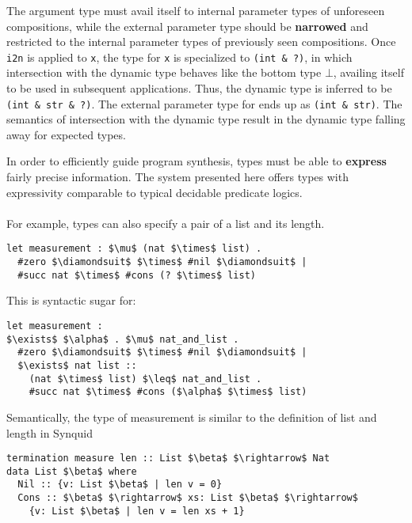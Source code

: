 \documentclass[sigplan,screen]{acmart}
\begin{document}
The argument type must avail itself to internal parameter types of unforeseen compositions,
while the external parameter type should be \textbf{narrowed} and restricted 
to the internal parameter types of previously seen compositions.
Once \lstinline{i2n} is applied to \lstinline{x}, 
the type for \lstinline{x} is specialized to \lstinline{(int & ?)}, 
in which intersection with the dynamic type behaves like the bottom type $\bot$,
availing itself to be used in subsequent applications. 
Thus, the dynamic type is inferred to be \lstinline{(int & str & ?)}.
The external parameter type for ends up as \lstinline{(int & str)}. 
The semantics of intersection with the dynamic type result in the dynamic type
falling away for expected types.



In order to efficiently guide program synthesis, 
types must be able to \textbf{express} fairly precise information. 
The system presented here offers types with 
expressivity comparable to typical decidable predicate logics. \\
\hfill \\
For example, types can also specify a pair of a list and its length.

\begin{lstlisting}[]
let measurement : $\mu$ (nat $\times$ list) .
  #zero $\diamondsuit$ $\times$ #nil $\diamondsuit$ | 
  #succ nat $\times$ #cons (? $\times$ list)
\end{lstlisting} 

\hfill

\noindent This is syntactic sugar for:

\begin{lstlisting}[]
let measurement : 
$\exists$ $\alpha$ . $\mu$ nat_and_list .
  #zero $\diamondsuit$ $\times$ #nil $\diamondsuit$ | 
  $\exists$ nat list :: 
    (nat $\times$ list) $\leq$ nat_and_list .
    #succ nat $\times$ #cons ($\alpha$ $\times$ list)
\end{lstlisting}

\hfill

\noindent Semantically, the type of measurement is similar to the definition of 
list and length in Synquid \cite{}    

\begin{lstlisting}[keywords={termination, measure, data, where}]
termination measure len :: List $\beta$ $\rightarrow$ Nat 
data List $\beta$ where
  Nil :: {v: List $\beta$ | len v = 0}
  Cons :: $\beta$ $\rightarrow$ xs: List $\beta$ $\rightarrow$ 
    {v: List $\beta$ | len v = len xs + 1}

\end{lstlisting}
\end{document}
